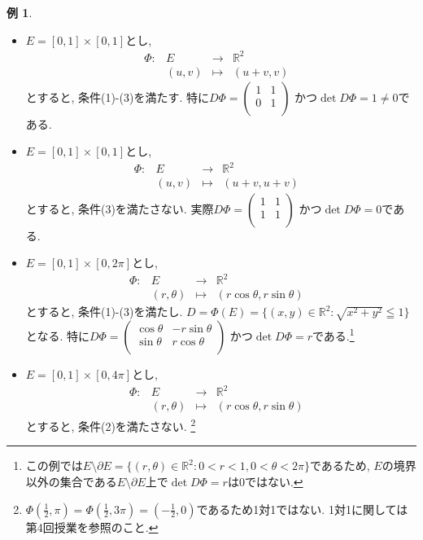 \documentclass[dvipdfmx,a4paper,11pt]{article}
\newcommand{\R}{\mathbb{R}}
\theoremstyle{definition}
\newtheorem{exa}[thm]{例}
\begin{document}
\begin{exa}
\begin{itemize}
\item $E=[0,1]\times[0,1]$とし, 
 $$
\begin{array}{ccccc}
\Phi: &E & \rightarrow & \R^2 & \\
&(u,v) & \longmapsto & (u+v,v)&
\end{array}
$$
とすると, 条件(1)-(3)を満たす.
特に$
D\Phi=
\left(\begin{array}{cc} 1 &1 \\ 0& 1 \\ \end{array} \right)
$
かつ$\det D\Phi =1 \neq 0$である.

\item $E=[0,1]\times[0,1]$とし, 
 $$
\begin{array}{ccccc}
\Phi: &E & \rightarrow & \R^2 & \\
&(u,v) & \longmapsto & (u+v,u+v)&
\end{array}
$$
とすると, 条件(3)を満たさない.
実際$
D\Phi=
\left(\begin{array}{cc} 1 &1 \\ 1& 1 \\ \end{array} \right)
$
かつ$\det D\Phi =0$である.

\item $E=[0,1]\times[0,2\pi]$とし, 
 $$
\begin{array}{ccccc}
\Phi: &E & \rightarrow & \R^2 & \\
&(r,\theta) & \longmapsto & (r \cos \theta , r \sin \theta)&
\end{array}
$$
とすると, 条件(1)-(3)を満たし. $D = \Phi(E) =  \{ (x,y)\in \R^2 :\sqrt{x^2 + y^2 } \leqq 1  \}$となる.
特に$
D\Phi=
\left(\begin{array}{cc} \cos \theta  &-r \sin \theta \\ \sin \theta& r \cos \theta  \\ \end{array} \right)
$
かつ$\det D\Phi =r$である.\footnote{この例では$E \setminus \partial E = \{ (r,\theta)\in \R^2 : 0 < r<1, 0<\theta <2\pi\}$であるため, $E$の境界以外の集合である$E \setminus\partial E$上で$\det D\Phi =r$は0ではない.}

\item $E=[0,1]\times[0,4\pi]$とし, 
 $$
\begin{array}{ccccc}
\Phi: &E & \rightarrow & \R^2 & \\
&(r,\theta) & \longmapsto & (r \cos \theta , r \sin \theta)&
\end{array}
$$
とすると, 条件(2)を満たさない.
\footnote{$\Phi(\frac{1}{2}, \pi)=\Phi( \frac{1}{2}, 3\pi) =(-\frac{1}{2}, 0)$であるため1対1ではない. 1対1に関しては第4回授業を参照のこと.}
\end{itemize}

\end{exa}
\end{document}
